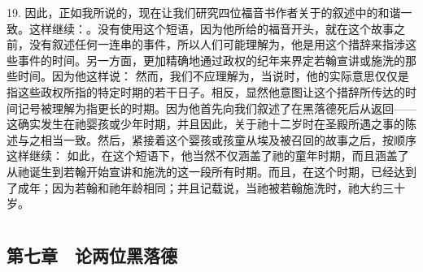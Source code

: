 19. 因此，正如我所说的，现在让我们研究四位福音书作者关于的叙述中的和谐一致。这样继续：。没有使用这个短语，因为他所给的福音开头，就在这个故事之前，没有叙述任何一连串的事件，所以人们可能理解为，他是用这个措辞来指涉这些事件的时间。另一方面，更加精确地通过政权的纪年来界定若翰宣讲或施洗的那些时间。因为他这样说： 然而，我们不应理解为，当说时，他的实际意思仅仅是指这些政权所指的特定时期的若干日子。相反，显然他意图让这个措辞所传达的时间记号被理解为指更长的时期。因为他首先向我们叙述了在黑落德死后从返回——这确实发生在祂婴孩或少年时期，并且因此，关于祂十二岁时在圣殿所遇之事的陈述与之相当一致。然后，紧接着这个婴孩或孩童从埃及被召回的故事之后，按顺序这样继续： 如此，在这个短语下，他当然不仅涵盖了祂的童年时期，而且涵盖了从祂诞生到若翰开始宣讲和施洗的这一段所有时期。而且，在这个时期，已经达到了成年；因为若翰和祂年龄相同；并且记载说，当祂被若翰施洗时，祂大约三十岁。\par



\section{}


\subsection{第七章　论两位黑落德}

